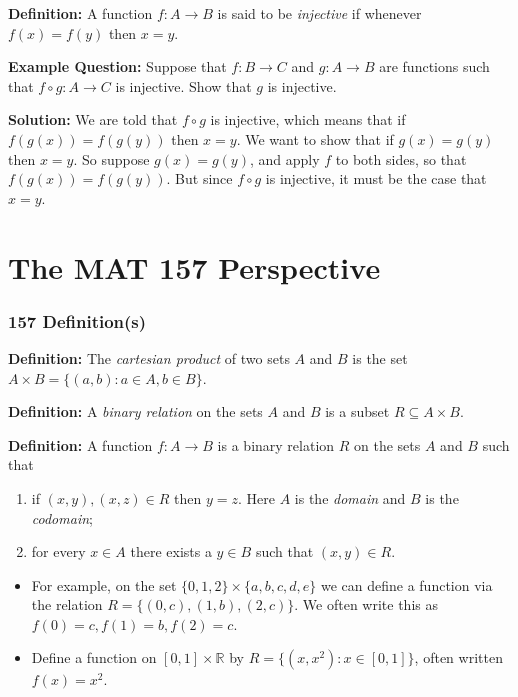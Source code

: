 \documentclass[aspectratio=169]{beamer}
\begin{document}
\begin{frame}[t]
    \textbf{Definition:} A function $f: A \to B$ is said to be \emph{injective} if whenever $f(x) = f(y)$ then $x=y$. 

    \vfill

    \textbf{Example Question:} Suppose that $f: B \to C$ and $g: A \to B$ are functions such that $f \circ g: A \to C$ is injective. Show that $g$ is injective.

    \vfill

    \textbf{Solution:} We are told that $f\circ g$ is injective, which means that if $f(g(x)) = f(g(y))$ then $x=y$. We want to show that if $g(x) = g(y)$ then $x=y$. So suppose $g(x) = g(y)$, and apply $f$ to both sides, so that $f(g(x)) = f(g(y))$. But since $f\circ g$ is injective, it must be the case that $x=y$.

\end{frame}

\section{The MAT 157 Perspective}

\begin{frame}
    \frametitle{157 Definition(s)}
    
    \textbf{Definition:} The \emph{cartesian product} of two sets $A$ and $B$ is the set $A \times B = \{ (a,b): a \in A, b \in B\}$. 

    \vfill

    \textbf{Definition:} A \emph{binary relation} on the sets $A$ and $B$ is a subset $R \subseteq A \times B$.

    \vfill

    \textbf{Definition:} A function $f: A \to B$ is a binary relation $R$ on the sets $A$ and $B$ such that 
    \begin{enumerate}
        \item if $(x,y),(x,z) \in R$ then $y=z$. Here $A$ is the \emph{domain} and $B$ is the \emph{codomain};

        \item for every $x \in A$ there exists a $y \in B$ such that $(x,y) \in R$.
    \end{enumerate}

    \vfill

    \begin{itemize}
        \item For example, on the set $\{0,1,2\} \times \{a,b,c,d,e\}$ we can define a function via the relation $R = \{ (0,c), (1,b), (2,c)\}$. We often write this as $f(0) = c, f(1) = b, f(2) =c $.
        \item Define a function on $[0,1] \times \mathbb R$ by $R = \{ (x,x^2) : x \in [0,1]\}$, often written $f(x) = x^2$.
    \end{itemize}
\end{frame}
\end{document}

